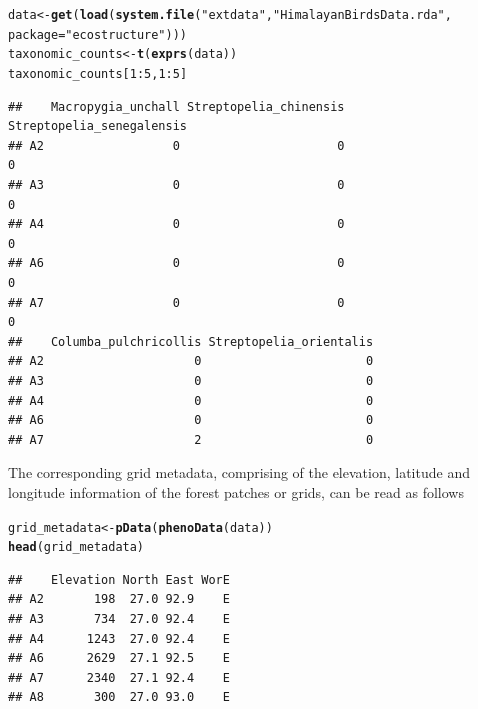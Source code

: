 \documentclass[12pt]{article}\usepackage[]{graphicx}\usepackage[usenames,dvipsnames]{color}
\makeatletter
\newcommand{\hlnum}[1]{\textcolor[rgb]{0.686,0.059,0.569}{#1}}%
\newcommand{\hlstr}[1]{\textcolor[rgb]{0.192,0.494,0.8}{#1}}%
\newcommand{\hlopt}[1]{\textcolor[rgb]{0,0,0}{#1}}%
\newcommand{\hlstd}[1]{\textcolor[rgb]{0.345,0.345,0.345}{#1}}%
\newcommand{\hlkwb}[1]{\textcolor[rgb]{0.69,0.353,0.396}{#1}}%
\newcommand{\hlkwc}[1]{\textcolor[rgb]{0.333,0.667,0.333}{#1}}%
\newcommand{\hlkwd}[1]{\textcolor[rgb]{0.737,0.353,0.396}{\textbf{#1}}}%
\newenvironment{kframe}{%
 \def\at@end@of@kframe{}%
 \ifinner\ifhmode%
  \def\at@end@of@kframe{\end{minipage}}%
  \begin{minipage}{\columnwidth}%
 \fi\fi%
 \def\FrameCommand##1{\hskip\@totalleftmargin \hskip-\fboxsep
 \colorbox{shadecolor}{##1}\hskip-\fboxsep
     \hskip-\linewidth \hskip-\@totalleftmargin \hskip\columnwidth}%
 \MakeFramed {\advance\hsize-\width
   \@totalleftmargin\z@ \linewidth\hsize
   \@setminipage}}%
 {\par\unskip\endMakeFramed%
 \at@end@of@kframe}
\newenvironment{knitrout}{}{} %
\makeatother
\begin{document}
\begin{knitrout}
\color{fgcolor}\begin{kframe}
\begin{alltt}
\hlstd{data} \hlkwb{<-} \hlkwd{get}\hlstd{(}\hlkwd{load}\hlstd{(}\hlkwd{system.file}\hlstd{(}\hlstr{"extdata"}\hlstd{,} \hlstr{"HimalayanBirdsData.rda"}\hlstd{,}
                             \hlkwc{package} \hlstd{=} \hlstr{"ecostructure"}\hlstd{)))}
\hlstd{taxonomic_counts} \hlkwb{<-} \hlkwd{t}\hlstd{(}\hlkwd{exprs}\hlstd{(data))}
\hlstd{taxonomic_counts[}\hlnum{1}\hlopt{:}\hlnum{5}\hlstd{,}\hlnum{1}\hlopt{:}\hlnum{5}\hlstd{]}
\end{alltt}
\begin{verbatim}
##    Macropygia_unchall Streptopelia_chinensis Streptopelia_senegalensis
## A2                  0                      0                         0
## A3                  0                      0                         0
## A4                  0                      0                         0
## A6                  0                      0                         0
## A7                  0                      0                         0
##    Columba_pulchricollis Streptopelia_orientalis
## A2                     0                       0
## A3                     0                       0
## A4                     0                       0
## A6                     0                       0
## A7                     2                       0
\end{verbatim}
\end{kframe}
\end{knitrout}


The corresponding grid metadata, comprising of the elevation, latitude and longitude information of the forest patches or grids, can be read as follows

\begin{knitrout}
\color{fgcolor}\begin{kframe}
\begin{alltt}
\hlstd{grid_metadata} \hlkwb{<-} \hlkwd{pData}\hlstd{(}\hlkwd{phenoData}\hlstd{(data))}
\hlkwd{head}\hlstd{(grid_metadata)}
\end{alltt}
\begin{verbatim}
##    Elevation North East WorE
## A2       198  27.0 92.9    E
## A3       734  27.0 92.4    E
## A4      1243  27.0 92.4    E
## A6      2629  27.1 92.5    E
## A7      2340  27.1 92.4    E
## A8       300  27.0 93.0    E
\end{verbatim}
\end{kframe}
\end{knitrout}
\end{document}
